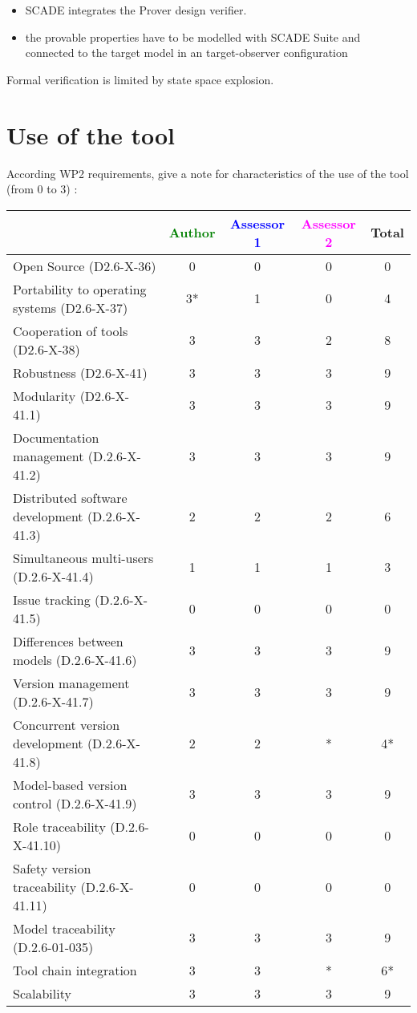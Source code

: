 \begin{itemize}
	\item SCADE integrates the Prover design verifier. 
	\item the provable properties have to be modelled with SCADE Suite and connected to the target model in an target-observer configuration
\end{itemize}


\begin{assessor1}
  Formal verification is limited by state space explosion.
\end{assessor1}

\section{Use of the tool}


According WP2 requirements, give a note for characteristics of the use of the tool (from 0 to 3) :

\begin{tabular}{|l | c | c | c | c|}
\hline
& \textcolor{green}{Author} & \textcolor{blue}{Assessor 1} & \textcolor{magenta}{Assessor 2} & Total \\
\hline 
Open Source (D2.6-X-36) &  0& 0 &0 & 0 \\
\hline 
Portability to operating systems (D2.6-X-37) &  3*&
1 &0 & 4 \\
\hline
Cooperation of tools (D2.6-X-38) &  3& 3 &2 & 8 \\
\hline
Robustness (D2.6-X-41) &  3& 3 &3 & 9 \\
\hline
Modularity (D2.6-X-41.1) &  3& 3 &3 & 9 \\
\hline
Documentation management (D.2.6-X-41.2) &  3& 3 &3 & 9 \\
\hline
Distributed software development (D.2.6-X-41.3)  &
2& 2 &2 & 6 \\
\hline
Simultaneous multi-users (D.2.6-X-41.4)   &  1& 1 &1 & 3 \\
\hline
Issue tracking (D.2.6-X-41.5) &  0&0 &0 & 0 \\
\hline
Differences between models (D.2.6-X-41.6) &  3& 3 &3 & 9 \\
\hline
Version management (D.2.6-X-41.7) &  3& 3 &3 & 9 \\
\hline
Concurrent version development (D.2.6-X-41.8) &  2&
2& * & 4* \\
\hline
Model-based version control (D.2.6-X-41.9) &  3& 3 &3 & 9 \\
\hline
Role traceability (D.2.6-X-41.10) &  0& 0 &0 & 0 \\
\hline
Safety version traceability (D.2.6-X-41.11) &  0& 0 &0 & 0 \\
\hline
Model traceability (D.2.6-01-035) & 3 & 3 &3 & 9 \\
\hline
Tool chain integration & 3 & 3 &* & 6* \\
\hline
Scalability & 3 & 3 &3 & 9 \\
\hline
\end{tabular}

